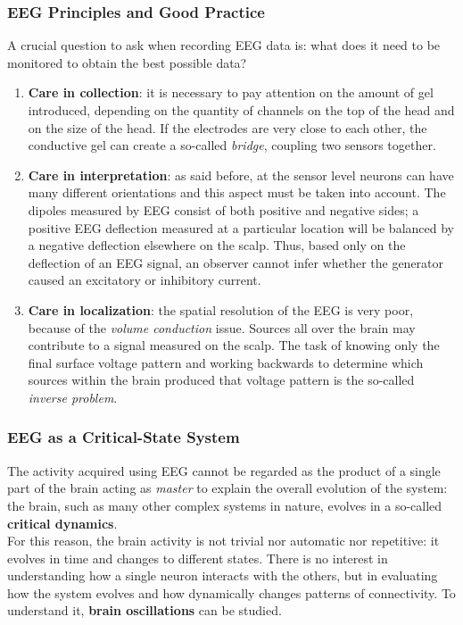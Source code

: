 \subsubsection{EEG Principles and Good Practice}
A crucial question to ask when recording EEG data is: what does it need to be monitored to
obtain the best possible data?
\begin{enumerate}
    \item \textbf{Care in collection}: it is necessary to pay attention on the amount of gel
          introduced, depending on the quantity of channels on the top of the head and on the
          size of the head. If the electrodes are very close to each other, the conductive gel
          can create a so-called \textit{bridge}, coupling two sensors together.
    \item \textbf{Care in interpretation}: as said before, at the sensor level neurons can have
          many different orientations and this aspect must be taken into account. The dipoles
          measured by EEG consist of both positive and negative sides; a positive EEG
          deflection measured at a particular location will be balanced by a negative
          deflection elsewhere on the scalp. Thus, based only on the deflection of an EEG
          signal, an observer cannot infer whether the generator caused an excitatory or
          inhibitory current.
    \item \textbf{Care in localization}: the spatial resolution of the EEG is very poor,
          because of the \textit{volume conduction} issue. Sources all over the brain may
          contribute to a signal measured on the scalp. The task of knowing only the final
          surface voltage pattern and working backwards to determine which sources within
          the brain produced that voltage pattern is the so-called \textit{inverse problem}.
\end{enumerate}
\subsubsection{EEG as a Critical-State System}
The activity acquired using EEG cannot be regarded as the product of a single part of the brain
acting as \textit{master} to explain the overall evolution of the system: the brain, such
as many other complex systems in nature, evolves in a so-called \textbf{critical dynamics}.\\
For this reason, the brain activity is not trivial nor automatic nor repetitive: it evolves in
time and changes to different states. There is no interest in understanding how a single
neuron interacts with the others, but in evaluating how the system evolves and how
dynamically changes patterns of connectivity. To understand it, \textbf{brain oscillations}
can be studied.

